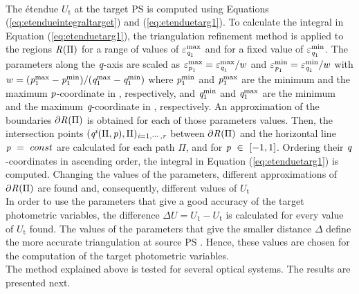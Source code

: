 \\ \indent The \'{e}tendue $U_{\textrm{t}}$ at the target PS  is computed using Equations (\ref{eq:etendueintegraltarget}) and (\ref{eq:etenduetarg1}).
To calculate the integral in Equation (\ref{eq:etenduetarg1}), the triangulation refinement method is applied to the regions $\mbox{$\emph{R}_{\textit{}}$}(\Pi)$ for a range of values of $\varepsilon_{\textit{q}_1}^{\textrm{max}}$ and for a fixed value of $\varepsilon_{\textit{q}_1}^{\textrm{min}}$. The parameters along the $\textit{q}$-axis are scaled as $\varepsilon_{\textit{p}_1}^{\textrm{max}} = \varepsilon_{\textit{q}_1}^{\textrm{max}}/w$ and 
$\varepsilon_{\textit{p}_1}^{\textrm{min}}  = \varepsilon_{\textit{q}_1}^{\textrm{min}}/w$ with 
$w = (\textit{p}_1^{\textrm{max}}-\textit{p}_1^{\textrm{min}})/(\textit{q}_1^{\textrm{max}}-\textit{q}_1^{\textrm{min}})$ where 
$\textit{p}_1^{\textrm{min}}$ and $\textit{p}_1^{\textrm{max}}$ are the minimum and the maximum $\textit{p}$-coordinate in , respectively, and 
$\textit{q}_1^{\textrm{min}}$ and $\textit{q}_1^{\textrm{max}}$ are the minimum and the maximum $\textit{q}$-coordinate in , respectively.
An approximation of the boundaries $\partial\mbox{$\emph{R}_{\textit{}}$}(\Pi)$ is obtained for each of those parameters values.
Then, the intersection points $(\textit{q}^{\textit{i}}( \Pi, \textit{p}), \Pi)_{\textit{i} = 1, \cdots, \textit{r}}$ between $\partial\mbox{$\emph{R}_{\textit{}}$}(\Pi)$
and the horizontal line $\textit{p}~=~ const$ are calculated for each path $\Pi$, and for $\textit{p}~\in~[-1,1]$. Ordering their $\textit{q}$-coordinates in ascending order, the integral in Equation (\ref{eq:etenduetarg1}) is computed.
Changing the values of the parameters, different approximations of $\partial\mbox{$\emph{R}_{\textit{}}$}(\Pi)$ are found and, consequently, different values of $U_{\textrm{t}}$
\\ \indent In order to use the parameters that give a good accuracy of the target photometric variables, the difference $\Delta U = U_1-U_{\textrm{t}}$ is calculated for every value of $U_{\textrm{t}}$ found. The values of the parameters that give the smaller distance $\Delta$ define the more accurate triangulation at source PS . Hence, these values are chosen for the computation of the target photometric variables. \\\indent
The method explained above is tested for several optical systems. The results are presented next.
